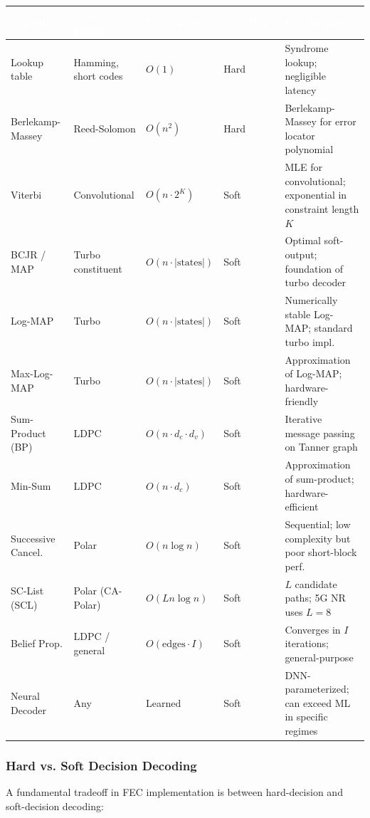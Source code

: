 \documentclass[11pt,letterpaper]{article}
\newcommand{\tableheader}[1]{\textbf{\sffamily\textcolor{white}{#1}}}
\begin{document}
\begin{center}
\begin{tabularx}{\textwidth}{L{3cm}L{2.5cm}L{2.5cm}C{1.8cm}X}
\toprule
{}
\tableheader{Algorithm} & \tableheader{Code Family} & \tableheader{Complexity} & \tableheader{Soft/Hard} & \tableheader{Key Property} \\
\midrule
Lookup table & Hamming, short codes & $O(1)$ & Hard & Syndrome lookup; negligible latency \\
Berlekamp-Massey & Reed-Solomon & $O(n^2)$ & Hard & Berlekamp-Massey for error locator polynomial \\
Viterbi & Convolutional & $O(n \cdot 2^K)$ & Soft & MLE for convolutional; exponential in constraint length $K$ \\
BCJR / MAP & Turbo constituent & $O(n \cdot |\text{states}|)$ & Soft & Optimal soft-output; foundation of turbo decoder \\
Log-MAP & Turbo & $O(n \cdot |\text{states}|)$ & Soft & Numerically stable Log-MAP; standard turbo impl. \\
Max-Log-MAP & Turbo & $O(n \cdot |\text{states}|)$ & Soft & Approximation of Log-MAP; hardware-friendly \\
Sum-Product (BP) & LDPC & $O(n \cdot d_c \cdot d_v)$ & Soft & Iterative message passing on Tanner graph \\
Min-Sum & LDPC & $O(n \cdot d_c)$ & Soft & Approximation of sum-product; hardware-efficient \\
Successive Cancel. & Polar & $O(n \log n)$ & Soft & Sequential; low complexity but poor short-block perf. \\
SC-List (SCL) & Polar (CA-Polar) & $O(Ln \log n)$ & Soft & $L$ candidate paths; 5G NR uses $L=8$ \\
Belief Prop. & LDPC / general & $O(\text{edges} \cdot I)$ & Soft & Converges in $I$ iterations; general-purpose \\
Neural Decoder & Any & Learned & Soft & DNN-parameterized; can exceed ML in specific regimes \\
\bottomrule
\end{tabularx}
\end{center}

\subsubsection{Hard vs. Soft Decision Decoding}

A fundamental tradeoff in FEC implementation is between hard-decision and soft-decision decoding:
\end{document}
